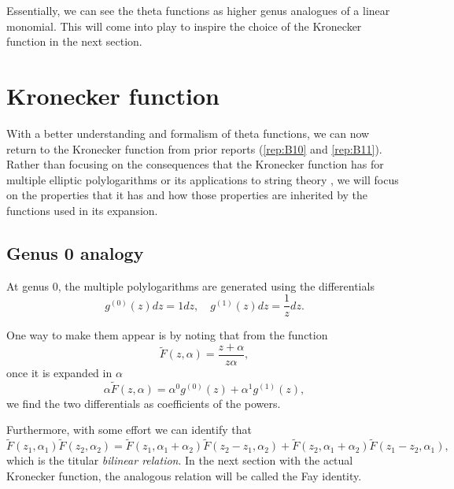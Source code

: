 Essentially, we can see the theta functions as higher genus analogues of a linear monomial. This will come into play to inspire the choice of the Kronecker function in the next section.

\section{Kronecker function}\label{secB12:Kronecker}

With a better understanding and formalism of theta functions, we can now return to the Kronecker function from prior reports (\ref{rep:B10} and \ref{rep:B11}). Rather than focusing on the consequences that the Kronecker function has for multiple elliptic polylogarithms \cite{BL13} or its applications to string theory \cite{Broedel_2022}, we will focus on the properties that it has and how those properties are inherited by the functions used in its expansion.

\subsection{Genus 0 analogy}

At genus 0, the multiple polylogarithms are generated using the differentials
\begin{equation}
    g^{(0)}(z)dz = 1 dz , \quad g^{(1)}(z)dz = \frac{1}{z} dz.
\end{equation}

One way to make them appear is by noting that from the function
\begin{equation}
    \tilde F(z,\alpha) = \frac{z+\alpha}{z\alpha},
\end{equation}
once it is expanded in $\alpha$
\begin{equation}\label{eqnB12:ExpandExample}
    \alpha \tilde{F}(z,\alpha) = \alpha^0 g^{(0)}(z) + \alpha^1 g^{(1)}(z),
\end{equation}
we find the two differentials as coefficients of the powers.

Furthermore, with some effort we can identify that
\begin{equation}
    \tilde{F}(z_1,\alpha_1)\tilde{F}(z_2,\alpha_2) = \tilde{F}(z_1,\alpha_1+\alpha_2)\tilde{F}(z_2-z_1,\alpha_2) + \tilde{F}(z_2,\alpha_1+\alpha_2)\tilde{F}(z_1-z_2,\alpha_1),
\end{equation}
which is the titular \emph{bilinear relation}. In the next section with the actual Kronecker function, the analogous relation will be called the Fay identity.

